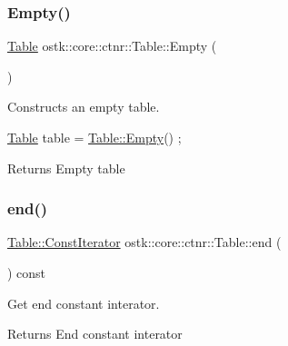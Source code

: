 \subsubsection{\texorpdfstring{Empty()}{Empty()}}
{\footnotesize\ttfamily \hyperlink{classostk_1_1core_1_1ctnr_1_1_table}{Table} ostk\+::core\+::ctnr\+::\+Table\+::\+Empty (\begin{DoxyParamCaption}{ }\end{DoxyParamCaption})\hspace{0.3cm}{\ttfamily [static]}}



Constructs an empty table. 


\begin{DoxyCode}
\hyperlink{classostk_1_1core_1_1ctnr_1_1_table_a1b799fa804faf23f9dd4905df90a5cd7}{Table} table = \hyperlink{classostk_1_1core_1_1ctnr_1_1_table_af7ec9c84859ac8809021556c1c26dd8b}{Table::Empty}() ;
\end{DoxyCode}


\begin{DoxyReturn}{Returns}
Empty table 
\end{DoxyReturn}
\mbox{\label{classostk_1_1core_1_1ctnr_1_1_table_a0c7c2095ac2a834b689e16a49b2f001a}} 
\subsubsection{\texorpdfstring{end()}{end()}}
{\footnotesize\ttfamily \hyperlink{classostk_1_1core_1_1ctnr_1_1_table_a44e6a375120737f0675ea6689022050f}{Table\+::\+Const\+Iterator} ostk\+::core\+::ctnr\+::\+Table\+::end (\begin{DoxyParamCaption}{ }\end{DoxyParamCaption}) const}



Get end constant interator. 

\begin{DoxyReturn}{Returns}
End constant interator 
\end{DoxyReturn}
\mbox{\label{classostk_1_1core_1_1ctnr_1_1_table_ae06b81ee41dfc025d414c4bc7e6c7808}} 
